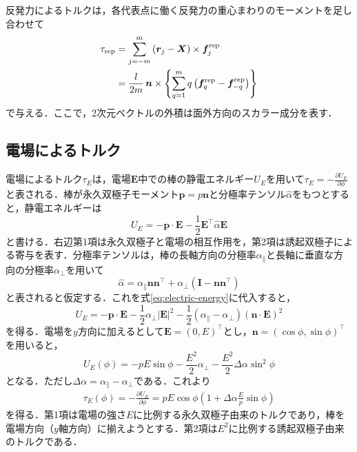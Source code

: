 \documentclass[dvipdfmx]{ampbt}
\begin{document}
  反発力によるトルクは，各代表点に働く反発力の重心まわりのモーメントを足し合わせて
  \begin{align}
    \tau_{\mathrm{rep}}
     & =
    \sum_{j=-m}^{m}
    \left(\bm{r}_j-\bm{X}\right)\times
    \bm{f}^{\mathrm{rep}}_j \notag \\
     & =
    \frac{l}{2m}\,
    \bm{n}\times
    \left\{
    \sum_{q=1}^{m}
    q\left(\bm{f}^{\mathrm{rep}}_q-\bm{f}^{\mathrm{rep}}_{-q}\right)
    \right\}
    \label{eq:rep-torque}
  \end{align}
  で与える．ここで，2次元ベクトルの外積は面外方向のスカラー成分を表す．

  \subsection{電場によるトルク}
  \label{subsec:electric-torque}
  電場によるトルク$\tau_E$は，電場$\bm{E}$中での棒の静電エネルギー$U_E$を用いて$\tau_E=-\frac{\partial U_E}{\partial\phi}$と表される．棒が永久双極子モーメント$\bm{p}=p\bm{n}$と分極率テンソル$\hat{\alpha}$をもつとすると，静電エネルギーは
  \begin{equation}
    U_E=-\bm{p}\cdot\bm{E}-\frac12\bm{E}^\top\hat{\alpha}\bm{E}
    \label{eq:electric-energy}
  \end{equation}
  と書ける．右辺第1項は永久双極子と電場の相互作用を，第2項は誘起双極子による寄与を表す．分極率テンソルは，棒の長軸方向の分極率$\alpha_{\parallel}$と長軸に垂直な方向の分極率$\alpha_{\perp}$を用いて
  \begin{equation}
    \hat{\alpha}
    =\alpha_{\parallel}\bm{n}\bm{n}^\top
    +\alpha_{\perp}\left(\bm{I}-\bm{n}\bm{n}^\top\right)
  \end{equation}
  と表されると仮定する．これを式\eqref{eq:electric-energy}に代入すると，
  \begin{equation}
    U_E
    =-\bm{p}\cdot\bm{E}
    -\frac12\alpha_{\perp}|\bm{E}|^2
    -\frac12\left(\alpha_{\parallel}-\alpha_{\perp}\right)
    \left(\bm{n}\cdot\bm{E}\right)^2
  \end{equation}
  を得る．電場を$y$方向に加えるとして$\bm{E}=(0,E)^\top$とし，$\bm{n}=(\cos\phi,\sin\phi)^\top$を用いると，
  \begin{equation}
    U_E(\phi)
    =-pE\sin\phi
    -\frac{E^2}{2}\alpha_{\perp}
    -\frac{E^2}{2}\Delta\alpha\sin^2\phi
  \end{equation}
  となる．ただし$\Delta\alpha=\alpha_{\parallel}-\alpha_{\perp}$である．これより
  \begin{align}
    \tau_E(\phi)
    = -\frac{\partial U_E}{\partial\phi}
    = pE\cos\phi
    \left(
    1+\Delta\alpha\frac{E}{p}\sin\phi
    \right)
    \label{eq:electric-torque}
  \end{align}
  を得る．第1項は電場の強さ$E$に比例する永久双極子由来のトルクであり，棒を電場方向（$y$軸方向）に揃えようとする．第2項は$E^2$に比例する誘起双極子由来のトルクである．
\end{document}
